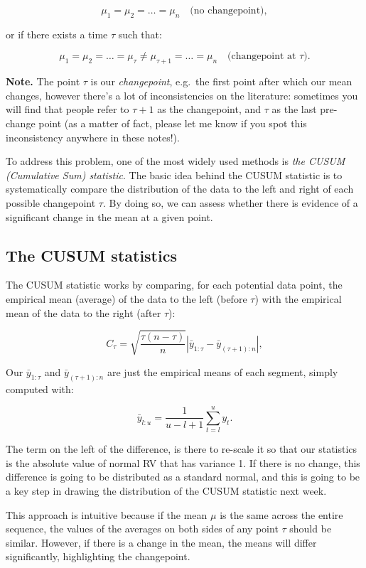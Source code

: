 \documentclass[
  letterpaper,
  DIV=11,
  numbers=noendperiod]{scrreprt}
\begin{document}
\[
\mu_1 = \mu_2 = \dots = \mu_n \quad \text{(no changepoint)},
\]

or if there exists a time \(\tau\) such that:

\[
\mu_1 = \mu_2 = \dots = \mu_\tau \neq \mu_{\tau+1} = \dots = \mu_n \quad \text{(changepoint at } \tau\text{)}.
\]

\textbf{Note.} The point \(\tau\) is our \emph{changepoint}, e.g.~the
first point after which our mean changes, however there's a lot of
inconsistencies on the literature: sometimes you will find that people
refer to \(\tau + 1\) as the changepoint, and \(\tau\) as the last
pre-change point (as a matter of fact, please let me know if you spot
this inconsistency anywhere in these notes!).

To address this problem, one of the most widely used methods is
\emph{the CUSUM (Cumulative Sum) statistic}. The basic idea behind the
CUSUM statistic is to systematically compare the distribution of the
data to the left and right of each possible changepoint \(\tau\). By
doing so, we can assess whether there is evidence of a significant
change in the mean at a given point.

\subsection{The CUSUM statistics}\label{the-cusum-statistics}

The CUSUM statistic works by comparing, for each potential data point,
the empirical mean (average) of the data to the left (before \(\tau\))
with the empirical mean of the data to the right (after \(\tau\)):

\[
C_{\tau} = \sqrt{\frac{\tau(n-\tau)}{n}} \left| \bar{y}_{1:\tau} - \bar{y}_{(\tau+1):n} \right|,
\]

Our \(\bar{y}_{1:\tau}\) and \(\bar{y}_{(\tau+1):n}\) are just the
empirical means of each segment, simply computed with:

\[
\bar{y}_{l:u} = \frac{1}{u - l + 1} \sum_{t = l}^{u} y_t.
\]

The term on the left of the difference, is there to re-scale it so that
our statistics is the absolute value of normal RV that has variance 1.
If there is no change, this difference is going to be distributed as a
standard normal, and this is going to be a key step in drawing the
distribution of the CUSUM statistic next week.

This approach is intuitive because if the mean \(\mu\) is the same
across the entire sequence, the values of the averages on both sides of
any point \(\tau\) should be similar. However, if there is a change in
the mean, the means will differ significantly, highlighting the
changepoint.
\end{document}

